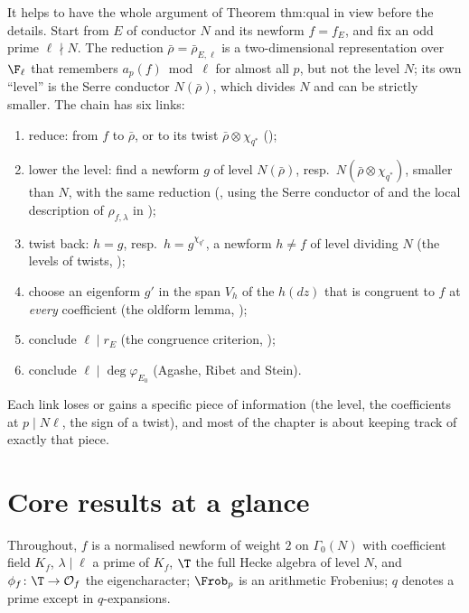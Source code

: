 It helps to have the whole argument of Theorem thm:qual in view before the details. Start from $E$ of conductor $N$ and its newform $f=f_E$, and fix an
odd prime $\ell\nmid N$. The reduction $\bar\rho=\bar\rho_{E,\ell}$ is a two-dimensional representation over $\F_\ell$ that remembers $a_p(f)\bmod\ell$ for almost all $p$, but not
the level $N$; its own ``level'' is the Serre conductor $N(\bar\rho)$, which divides $N$ and can be strictly smaller. The chain has six links:
\begin{enumerate}[label=(\arabic*)]
\item reduce: from $f$ to $\bar\rho$, or to its twist $\bar\rho\otimes\chi_{q^*}$ ();
\item lower the level: find a newform $g$ of level $N(\bar\rho)$, resp.\ $N(\bar\rho\otimes\chi_{q^*})$, smaller than $N$, with the same reduction
(, using the Serre conductor of  and the local description of $\rho_{f,\lambda}$ in );
\item twist back: $h=g$, resp.\ $h=g^{\chi_{q^*}}$, a newform $h\ne f$ of level dividing $N$ (the levels of twists, );
\item choose an eigenform $g'$ in the span $V_h$ of the $h(dz)$ that is congruent to $f$ at \emph{every} coefficient (the oldform lemma, );
\item conclude $\ell\mid r_E$ (the congruence criterion, );
\item conclude $\ell\mid\deg\varphi_{E_0}$ (Agashe, Ribet and Stein).
\end{enumerate}
Each link loses or gains a specific piece of information (the level, the coefficients at $p\mid N\ell$, the sign of a twist), and most of
the chapter is about keeping track of exactly that piece.

\section*{Core results at a glance}

Throughout, $f$ is a normalised newform of weight $2$ on $\Gamma_0(N)$ with coefficient field $K_f$, $\lambda\mid\ell$ a prime of $K_f$, $\T$ the full Hecke algebra of level $N$, and
$\phi_f\colon\T\to\mathcal{O}_f$ the eigencharacter; $\Frob_p$ is an arithmetic Frobenius; $q$ denotes a prime except in $q$-expansions.

